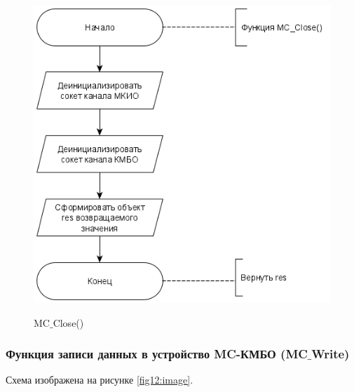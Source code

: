 	\begin{figure}[ph!]
		\centering
		\begin{center}
			{\includegraphics[scale=0.5]{schemes/mc_close.png}}
			\caption{MC$\_$Close()}
			\label{fig11:image}
		\end{center}
	\end{figure}

	\newpage
	\subsubsection{Функция записи данных в устройство MC-КМБО (MC$\_$Write)}
	
	Схема изображена на рисунке \ref{fig12:image}.
	
